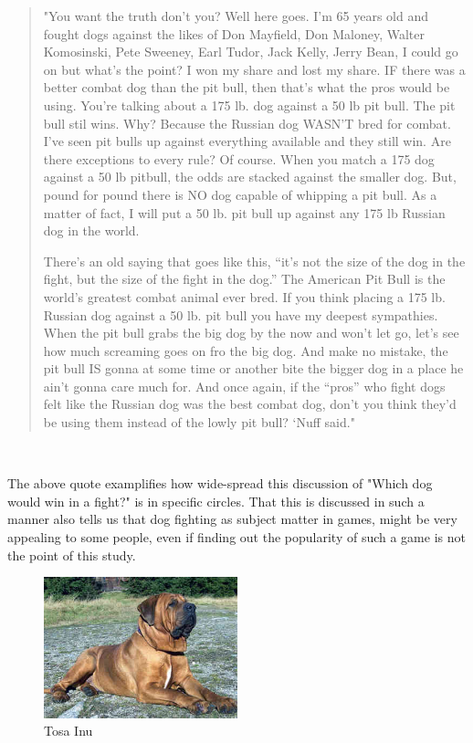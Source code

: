 \blockquote{"You want the truth don’t you? Well here goes. I’m 65 years old and fought dogs against the likes of Don Mayfield, Don Maloney, Walter Komosinski, Pete Sweeney, Earl Tudor, Jack Kelly, Jerry Bean, I could go on but what’s the point? I won my share and lost my share. IF there was a better combat dog than the pit bull, then that’s what the pros would be using. You’re talking about a 175 lb. dog against a 50 lb pit bull. The pit bull stil wins. Why? Because the Russian dog WASN’T bred for combat. I’ve seen pit bulls up against everything available and they still win. Are there exceptions to every rule? Of course. When you match a 175 dog against a 50 lb pitbull, the odds are stacked against the smaller dog. But, pound for pound there is NO dog capable of whipping a pit bull. As a matter of fact, I will put a 50 lb. pit bull up against any 175 lb Russian dog in the world. \

There’s an old saying that goes like this, “it’s not the size of the dog in the fight, but the size of the fight in the dog.” The American Pit Bull is the world’s greatest combat animal ever bred. If you think placing a 175 lb. Russian dog against a 50 lb. pit bull you have my deepest sympathies. When the pit bull grabs the big dog by the now and won’t let go, let’s see how much screaming goes on fro the big dog. And make no mistake, the pit bull IS gonna at some time or another bite the bigger dog in a place he ain’t gonna care much for. And once again, if the “pros” who fight dogs felt like the Russian dog was the best combat dog, don’t you think they’d be using them instead of the lowly pit bull? ‘Nuff said." \citep{amptvsovc}\label{pitbullQuote}}\


The above quote examplifies how wide-spread this discussion of "Which dog would win in a fight?" is in specific circles. That this is discussed in such a manner also tells us that dog fighting as subject matter in games, might be very appealing to some people, even if finding out the popularity of such a game is not the point of this study. 

\begin{figure} 
	\centering
    \includegraphics[width=0.5\textwidth]{tosa.jpg}
    \caption{Tosa Inu}
    \label{fig:tosa}
\end{figure}

